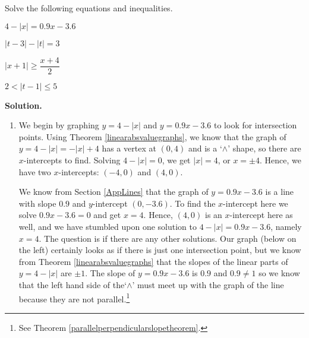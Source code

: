 \documentclass{ximera}
\begin{document}
\begin{ex} \label{abseqnineqex}  Solve the following equations and inequalities.  

\begin{enumerate}

\begin{multicols}{4}

\item $4-|x| = 0.9x  - 3.6$ 

\item  $|t-3|  - |t|= 3$ 

\item $|x+1|\geq \dfrac{x+4}{2}$

\item $2 < |t-1| \leq 5$ 


\end{multicols}

\end{enumerate}


{\bf Solution.}  
\begin{enumerate}

\item  We begin by graphing $y = 4 - |x|$ and $y = 0.9x - 3.6$ to look for intersection points. Using Theorem \ref{linearabsvaluegraphs}, we know that the graph of $y = 4-|x| = -|x|+4$ has a vertex at $(0,4)$ and is a `$\wedge$' shape, so there are $x$-intercepts to find.  Solving $4-|x| = 0$, we get $|x| = 4$, or  $x = \pm 4$.  Hence, we have two $x$-intercepts: $(-4,0)$ and $(4,0)$.    

\medskip

We know from Section \ref{AppLines} that the graph of $y = 0.9x - 3.6$ is a line with slope $0.9$ and $y$-intercept $(0, -3.6)$. To find the $x$-intercept here we solve $0.9x - 3.6 = 0$ and get $x = 4$.  Hence, $(4,0)$ is an $x$-intercept here as well, and we have stumbled upon one solution to $4-|x| = 0.9x - 3.6$, namely $x = 4$.  The question is if there are any other solutions.  Our graph (below on the left) certainly looks as if there is just one intersection point, but we know from Theorem \ref{linearabsvaluegraphs} that the slopes of the linear parts of $y = 4 - |x|$ are $\pm 1$.  The slope of $y =  0.9x - 3.6$ is $0.9$ and $0.9 \neq 1$ so we know that the left hand side of the`$\wedge$' must meet up with the graph of the line because they are not parallel.\footnote{See Theorem \ref{parallelperpendicularslopetheorem}.}


\end{enumerate}
\end{ex}
\end{document}
